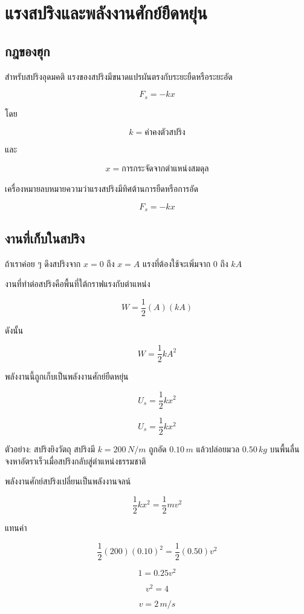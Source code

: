 \section{แรงสปริงและพลังงานศักย์ยืดหยุ่น}

\subsection{กฎของฮุก}

สำหรับสปริงอุดมคติ แรงของสปริงมีขนาดแปรผันตรงกับระยะยืดหรือระยะอัด

\[
F_s=-kx
\]

โดย

\[
k=\text{ค่าคงตัวสปริง}
\]

และ

\[
x=\text{การกระจัดจากตำแหน่งสมดุล}
\]

เครื่องหมายลบหมายความว่าแรงสปริงมีทิศต้านการยืดหรือการอัด

\begin{tcolorbox}[title=กฎของฮุก]
\[
F_s=-kx
\]
\end{tcolorbox}

\subsection{งานที่เก็บในสปริง}

ถ้าเราค่อย ๆ ดึงสปริงจาก $x=0$ ถึง $x=A$ แรงที่ต้องใช้จะเพิ่มจาก $0$ ถึง $kA$

งานที่ทำต่อสปริงคือพื้นที่ใต้กราฟแรงกับตำแหน่ง

\[
W=\frac{1}{2}(A)(kA)
\]

ดังนั้น

\[
W=\frac{1}{2}kA^2
\]

พลังงานนี้ถูกเก็บเป็นพลังงานศักย์ยืดหยุ่น

\[
U_s=\frac{1}{2}kx^2
\]

\begin{tcolorbox}[title=พลังงานศักย์ยืดหยุ่น]
\[
U_s=\frac{1}{2}kx^2
\]
\end{tcolorbox}

\begin{examplebox}{ตัวอย่าง: สปริงยิงวัตถุ}
สปริงมี $k=200\,\si{N/m}$ ถูกอัด $0.10\,\si{m}$ แล้วปล่อยมวล $0.50\,\si{kg}$ บนพื้นลื่น จงหาอัตราเร็วเมื่อสปริงกลับสู่ตำแหน่งธรรมชาติ

พลังงานศักย์สปริงเปลี่ยนเป็นพลังงานจลน์

\[
\frac{1}{2}kx^2=\frac{1}{2}mv^2
\]

แทนค่า

\[
\frac{1}{2}(200)(0.10)^2=\frac{1}{2}(0.50)v^2
\]

\[
1=0.25v^2
\]

\[
v^2=4
\]

\[
v=2\,\si{m/s}
\]
\end{examplebox}

